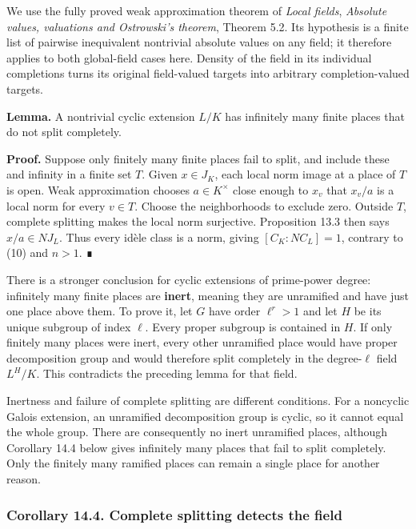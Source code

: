 \documentclass[11pt,a4paper]{article}
\begin{document}
We use the fully proved weak approximation theorem of \emph{Local
fields}, \emph{Absolute values, valuations and Ostrowski's theorem},
Theorem 5.2. Its hypothesis is a finite list of pairwise inequivalent
nontrivial absolute values on any field; it therefore applies to both
global-field cases here. Density of the field in its individual
completions turns its original field-valued targets into arbitrary
completion-valued targets.

\textbf{Lemma.} A nontrivial cyclic extension \(L/K\) has infinitely
many finite places that do not split completely.

\textbf{Proof.} Suppose only finitely many finite places fail to split,
and include these and infinity in a finite set \(T\). Given
\(x\in J_K\), each local norm image at a place of \(T\) is open. Weak
approximation chooses \(a\in K^\times\) close enough to \(x_v\) that
\(x_v/a\) is a local norm for every \(v\in T\). Choose the neighborhoods
to exclude zero. Outside \(T\), complete splitting makes the local norm
surjective. Proposition 13.3 then says \(x/a\in N J_L\). Thus every
idèle class is a norm, giving \([C_K:N C_L]=1\), contrary to (10) and
\(n>1\). ∎

There is a stronger conclusion for cyclic extensions of prime-power
degree: infinitely many finite places are \textbf{inert}, meaning they
are unramified and have just one place above them. To prove it, let
\(G\) have order \(\ell^r>1\) and let \(H\) be its unique subgroup of
index \(\ell\). Every proper subgroup is contained in \(H\). If only
finitely many places were inert, every other unramified place would have
proper decomposition group and would therefore split completely in the
degree-\(\ell\) field \(L^H/K\). This contradicts the preceding lemma
for that field.

Inertness and failure of complete splitting are different conditions.
For a noncyclic Galois extension, an unramified decomposition group is
cyclic, so it cannot equal the whole group. There are consequently no
inert unramified places, although Corollary 14.4 below gives infinitely
many places that fail to split completely. Only the finitely many
ramified places can remain a single place for another reason.

\subsubsection{Corollary 14.4. Complete splitting detects the
field}\label{corollary-14.4.-complete-splitting-detects-the-field}
\end{document}
